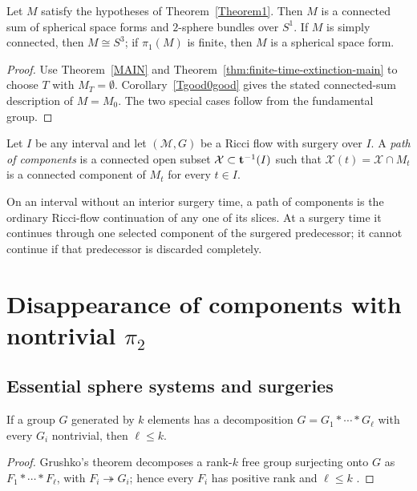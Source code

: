 \begin{corollary}
Let $M$ satisfy the hypotheses of Theorem~\ref{Theorem1}. Then $M$ is a
connected sum of spherical space forms and $2$-sphere bundles over $S^1$. If
$M$ is simply connected, then $M\cong S^3$; if $\pi_1(M)$ is finite, then $M$
is a spherical space form.
\end{corollary}
\begin{proof}
\sketch Use Theorem~\ref{MAIN} and
Theorem~\ref{thm:finite-time-extinction-main} to choose $T$ with
$M_T=\emptyset$. Corollary~\ref{Tgood0good} gives the stated connected-sum
description of $M=M_0$. The two special cases follow from the fundamental
group.
\end{proof}

\begin{definition}
\label{def:path-of-components}
Let $I$ be any interval and let $({\mathcal M},G)$ be a Ricci flow with
surgery over $I$. A \emph{path of components} is a connected open subset
${\mathcal X}\subset {\bf t}^{-1}(I)$ such that
${\mathcal X}(t)={\mathcal X}\cap M_t$ is a connected component of $M_t$ for
every $t\in I$.
\end{definition}

On an interval without an interior surgery time, a path of components is the
ordinary Ricci-flow continuation of any one of its slices. At a surgery time it
continues through one selected component of the surgered predecessor; it cannot
continue if that predecessor is discarded completely.

\section{Disappearance of components with nontrivial $\pi_2$}

\subsection{Essential sphere systems and surgeries}

\begin{lemma}
\label{lem:free-product-rank-bound}
\label{grouptheory}
If a group $G$ generated by $k$ elements has a decomposition
$G=G_1*\cdots*G_\ell$ with every $G_i$ nontrivial, then $\ell\le k$.
\end{lemma}
\begin{proof}
\sketch Grushko's theorem decomposes a rank-$k$ free group surjecting onto $G$
as $F_1*\cdots*F_\ell$, with $F_i\twoheadrightarrow G_i$; hence every $F_i$
has positive rank and $\ell\le k$ \cite{Stallings}.
\end{proof}

